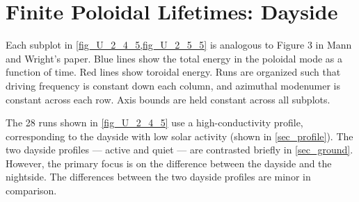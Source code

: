 \section{Finite Poloidal Lifetimes: Dayside}
  \label{sec_lifetimes_day}

Each subplot in \cref{fig_U_2_4_5,fig_U_2_5_5} is analogous to Figure 3 in Mann and Wright's paper\cite{mann_1995}. Blue lines show the total energy in the poloidal mode as a function of time. Red lines show toroidal energy. Runs are organized such that driving frequency is constant down each column, and azimuthal modenumer is constant across each row. Axis bounds are held constant across all subplots. 

The 28 runs shown in \cref{fig_U_2_4_5} use a high-conductivity profile, corresponding to the dayside with low solar activity (shown in \cref{sec_profile}). The two dayside profiles --- active and quiet --- are contrasted briefly in \cref{sec_ground}. However, the primary focus is on the difference between the dayside and the nightside. The differences between the two dayside profiles are minor in comparison. 

